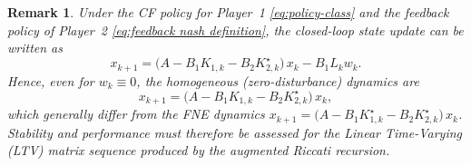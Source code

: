 \documentclass[letterpaper, 10 pt, conference]{ieeeconf}  %
\newtheorem{definition}{\textbf{Definition}}
\newtheorem{remark}{\textbf{Remark}}
\begin{document}


\begin{remark}
\label{rem:CF-homog}
Under the CF policy for Player~1 \eqref{eq:policy-class} and the feedback policy of Player~2 \eqref{eq:feedback nash definition}, the closed-loop state update can be written as
\[
x_{k+1}=\big(A-B_1K_{1,k}-B_2K^\star_{2,k}\big)\,x_k - B_1L_k w_k.
\]
Hence, even for $w_k\equiv 0$, the homogeneous (zero-disturbance) dynamics are
\[
x_{k+1}=\big({A-B_1K_{1,k}-B_2K^\star_{2,k}}\big)\,x_k,
\]
which generally differ from the FNE dynamics
$x_{k+1}=\big(A-B_1K^\star_{1,k}-B_2K^\star_{2,k}\big)\,x_k$.
Stability and performance must therefore be assessed for the Linear Time-Varying (LTV) matrix sequence produced by the augmented Riccati recursion.
\end{remark}
\end{document}
